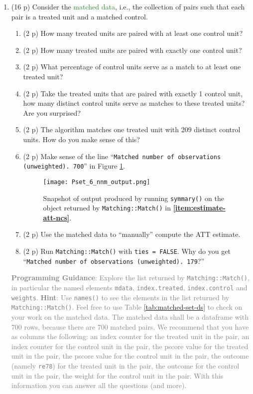 \documentclass{article}
\begin{document}
\begin{enumerate}[label=\textbf{Q\arabic{enumi}}.,ref=Q\arabic{enumi}, wide=0pt, itemsep=0em, topsep=5pt, labelindent=0pt, resume]
\item (16 p) Consider the \textcolor{ForestGreen}{matched data}, i.e., the collection of pairs such that each pair is a treated unit and a matched control.
\begin{enumerate}
\item (2 p) How many treated units are paired with at least one control unit? 
\item (2 p) How many treated units are paired with exactly one control unit? 
\item (2 p) What percentage of control units serve as a match to at least one treated unit? 
\item (2 p) Take the treated units that are paired with exactly 1 control unit, how many distinct control units serve as matches to these treated units? Are you surprised?
\item (2 p) The algorithm matches one treated unit with 209 distinct control units. How do you make sense of this?
\item (2 p) Make sense of the line ``\texttt{Matched number of observations (unweighted). 700}'' in Figure \ref{fig:nnm_output}. 
\begin{figure}[H]
\centering
  \texttt{[image: Pset\_6\_nnm\_output.png]}
  \caption{Snapshot of output produced by running \texttt{symmary()} on the object returned by \texttt{Matching::Match()} in \textbf{\ref{item:estimate-att-ncs}}.}
  \label{fig:nnm_output}
\end{figure}
\item (2 p) Use the matched data to ``manually'' compute the ATT estimate. 
\item (2 p) Run \texttt{Matching::Match()} with \texttt{ties = FALSE}. Why do you get ``\texttt{Matched number of observations (unweighted). 179}?'' 
\end{enumerate}
\textcolor{gray}{\textbf{Programming Guidance}: Explore the list returned by \texttt{Matching::Match()}, in particular the named elements \texttt{mdata}, \texttt{index.treated}, \texttt{index.control} and \texttt{weights}.} \textcolor{gray}{\textbf{Hint}: Use \texttt{names()} to see the elements in the list returned by \texttt{Matching::Match()}. Feel free to use Table \ref{tab:matched-set-ds} to check on your work on the matched data. The matched data shall be a dataframe with 700 rows, because there are 700 matched pairs. We recommend that you have as columns the following: an index counter for the treated unit in the pair, an index counter for the control unit in the pair, the pscore value for the treated unit in the pair, the pscore value for the control unit in the pair, the outcome (namely \texttt{re78}) for the treated unit in the pair, the outcome for the control unit in the pair, the weight for the control unit in the pair. With this information you can answer all the questions (and more).}

\end{enumerate}
\end{document}
